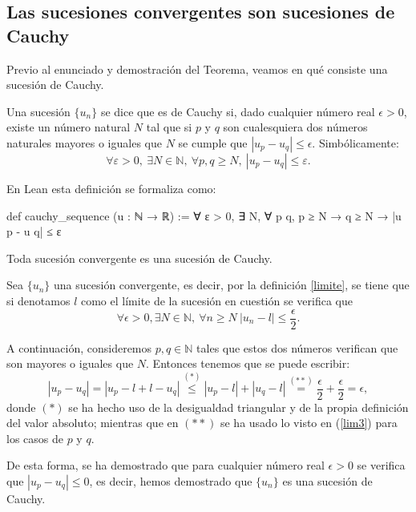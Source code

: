 \subsection{Las sucesiones convergentes son sucesiones de Cauchy}
Previo al enunciado y demostración del Teorema, veamos en qué
consiste una sucesión de Cauchy.
\begin{definicion}
	Una sucesión \(\{u_n\}\) se dice que es de Cauchy si,
	dado cualquier número real \(\epsilon >0\),
	existe un número natural \(N\) tal que si \(p\) y \(q\) son
	cualesquiera dos números naturales mayores o iguales que
	\(N\) se cumple que \(|u_p-u_q| \leq \epsilon \).
	Simbólicamente:
	\begin{equation}
	∀ ε > 0, \ ∃ N ∈ ℕ, \
	∀ p, q ≥ N, \ |u_p-u_q| ≤ ε.
	\end{equation}
\end{definicion}
En Lean esta definición se formaliza como:
\begin{leancode}
def cauchy_sequence (u : ℕ → ℝ) :=
∀ ε > 0, ∃ N, ∀ p q, p ≥ N → q ≥ N → |u p - u q| ≤ ε
\end{leancode}
\begin{teorema}
	Toda sucesión convergente es una sucesión de Cauchy.
\end{teorema}
\begin{demostracion}
	Sea \(\{u_n\}\) una sucesión convergente, es decir,
	por la definición \ref{limite}, se tiene que si denotamos
	\(l\) como el límite de la sucesión en cuestión se verifica que
\begin{equation}\label{lim3}
\forall \epsilon >0, \exists N \in \mathbb{N}, \  \forall n \geq N \
|u_n-l| \leq \frac{\epsilon}{2}.
\end{equation}

A continuación, consideremos \(p,q \in \mathbb{N}\) tales
que estos dos números verifican que son mayores o iguales
que \(N\). Entonces tenemos que se puede escribir:
\begin{equation*}
|u_p-u_q| = |u_p-l+l-u_q| \stackrel{(*)}{\leq} |u_p-l|+|u_q-l|
\stackrel{(**)}{=} \frac{\epsilon}{2}+\frac{\epsilon}{2}=\epsilon,
\end{equation*}
donde \( (*) \) se ha hecho uso de la desigualdad triangular y de
la propia definición del valor absoluto; mientras que en \((**)\)
se ha usado lo visto en (\ref{lim3}) para los casos de \(p\) y \(q\).

De esta forma, se ha demostrado que para cualquier número real \(\epsilon >0\)
se verifica que \( |u_p-u_q| \leq 0\), es decir, hemos demostrado
que \(\{u_n\}\) es una sucesión de Cauchy.
\end{demostracion}


